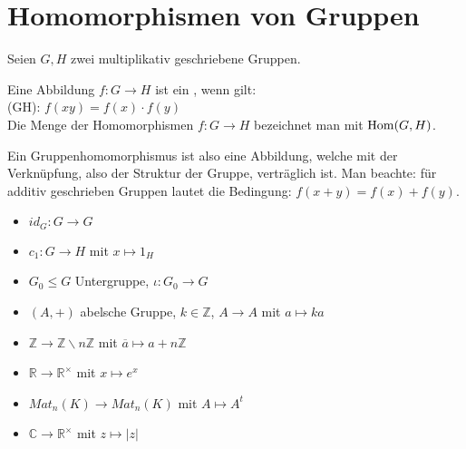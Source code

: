 \section{Homomorphismen von Gruppen}

Seien $G,H$ zwei multiplikativ geschriebene Gruppen.

\begin{definition}[Gruppenhomomorphismus]
	Eine Abbildung $f: G \to H$ ist ein , wenn gilt: \\
	(GH): $f(xy)=f(x)\cdot f(y)$ \\
	Die Menge der Homomorphismen $f:G\to H$ bezeichnet man mit $\operatorname{Hom}(G,H)$.
\end{definition}

\begin{remark}
	Ein Gruppenhomomorphismus ist also eine Abbildung, welche mit der Verknüpfung, also der Struktur 
	der Gruppe, verträglich ist. Man beachte: für additiv geschrieben Gruppen lautet die Bedingung: $f(x+y)=f(x)+f(y)$.
\end{remark}

\begin{example}
	\begin{itemize}
		\item $id_G: G \to G$
		\item $c_1:G\to H$ mit $x\mapsto 1_H$
		\item $G_0\le G$ Untergruppe, $\iota:G_0\to G$
		\item $(A,+)$ abelsche Gruppe, $k\in \mathbb Z$, $A\to A$ mit $a\mapsto ka$
		\item $\mathbb Z \to \mathbb Z\backslash n\mathbb Z$ mit $\overline a \mapsto a+n\mathbb Z$
		\item $\mathbb R \to \mathbb R^{\times}$ mit $x\mapsto e^x$
		\item $Mat_n(K)\to Mat_n(K)$ mit $A\mapsto A^t$
		\item $\mathbb C\to \mathbb R^{\times}$ mit $z\mapsto |z|$
	\end{itemize}
\end{example}

